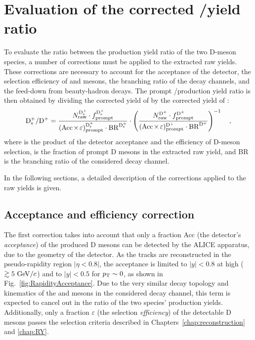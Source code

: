 \chapter{\texorpdfstring{Evaluation of the corrected \ds/\dpl yield ratio}{Evaluation of the corrected Ds+/D+ yield ratio}}\label{ch:corrections}

To evaluate the ratio between the production yield ratio of the two D-meson species, a number of corrections must be applied to the extracted raw yields. These corrections are necessary to account for the acceptance of the detector, the selection efficiency of \ds and \dpl mesons, the branching ratio of the decay channels, and the feed-down from beauty-hadron decays. The prompt \ds/\dpl production yield ratio is then obtained by dividing the corrected yield of \ds by the corrected yield of \dpl:
\begin{equation}\label{eq:DsDplusRatio}
        \mathrm{D_s^+}/\mathrm{D^+} = \frac{N_\mathrm{raw}^{\mathrm{D_s^+}}\cdot f_\mathrm{prompt}^\mathrm{D_s^+}}{(\mathrm{Acc}\mkern-2mu\times\mkern-2mu\varepsilon)_\mathrm{prompt}^\mathrm{D_s^+} \cdot \mathrm{BR}^\mathrm{D_s^+}} \cdot \left(\frac{N_\mathrm{raw}^{\mathrm{D^+}}\cdot f_\mathrm{prompt}^\mathrm{D^+}}{(\mathrm{Acc}\mkern-2mu\times\mkern-2mu\varepsilon)_\mathrm{prompt}^\mathrm{D^+} \cdot \mathrm{BR}^\mathrm{D^+}}\right)^{-1}\quad ,
\end{equation}
where \aeff is the product of the detector acceptance and the efficiency of D-meson selection, \fp is the fraction of prompt D mesons in the extracted raw yield, and BR is the branching ratio of the considered decay channel. 

In the following sections, a detailed description of the corrections applied to the raw yields is given.

\section{Acceptance and efficiency correction}\label{sec:aeff}
The first correction takes into account that only a fraction Acc (the detector's \emph{acceptance}) of the produced D mesons can be detected by the ALICE apparatus, due to the geometry of the detector. As the tracks are reconstructed in the pseudo-rapidity region $\lvert\eta<0.8\rvert$, the acceptance is limited to $\lvert y\rvert<0.8$ at high \pt ($\gtrsim5~\mathrm{Ge\kern-.1emV}/c$) and to $\lvert y\rvert<0.5$ for $p_\mathrm{T}\sim0$, as shown in Fig.~\ref{fig:RapidityAcceptance}. Due to the very similar decay topology and kinematics of the \ds and \dpl mesons in the considered decay channel, this term is expected to cancel out in the ratio of the two species' production yields. Additionally, only a fraction $\varepsilon$ (the selection \emph{efficiency}) of the detectable D mesons passes the selection criteria described in Chapters~\ref{chap:reconstruction} and \ref{chap:RY}.

